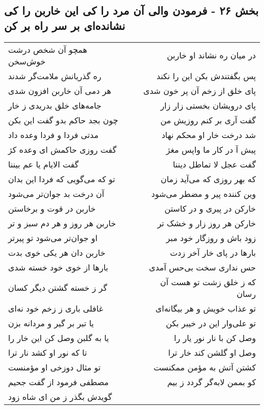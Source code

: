 \begin{center}
\section*{بخش ۲۶ - فرمودن والی آن مرد را کی این خاربن را کی نشانده‌ای بر سر راه بر کن}
\label{sec:sh026}
\begin{longtable}{l p{0.5cm} r}
همچو آن شخص درشت خوش‌سخن
&&
در میان ره نشاند او خاربن
\\
ره گذریانش ملامت‌گر شدند
&&
پس بگفتندش بکن این را نکند
\\
هر دمی آن خاربن افزون شدی
&&
پای خلق از زخم آن پر خون شدی
\\
جامه‌های خلق بدریدی ز خار
&&
پای درویشان بخستی زار زار
\\
چون بجد حاکم بدو گفت این بکن
&&
گفت آری بر کنم روزیش من
\\
مدتی فردا و فردا وعده داد
&&
شد درخت خار او محکم نهاد
\\
گفت روزی حاکمش ای وعده کژ
&&
پیش آ در کار ما واپس مغژ
\\
گفت الایام یا عم بیننا
&&
گفت عجل لا تماطل دیننا
\\
تو که می‌گویی که فردا این بدان
&&
که بهر روزی که می‌آید زمان
\\
آن درخت بد جوان‌تر می‌شود
&&
وین کننده پیر و مضطر می‌شود
\\
خاربن در قوت و برخاستن
&&
خارکن در پیری و در کاستن
\\
خاربن هر روز و هر دم سبز و تر
&&
خارکن هر روز زار و خشک تر
\\
او جوان‌تر می‌شود تو پیرتر
&&
زود باش و روزگار خود مبر
\\
خاربن دان هر یکی خوی بدت
&&
بارها در پای خار آخر زدت
\\
بارها از خوی خود خسته شدی
&&
حس نداری سخت بی‌حس آمدی
\\
گر ز خسته گشتن دیگر کسان
&&
که ز خلق زشت تو هست آن رسان
\\
غافلی باری ز زخم خود نه‌ای
&&
تو عذاب خویش و هر بیگانه‌ای
\\
یا تبر بر گیر و مردانه بزن
&&
تو علی‌وار این در خیبر بکن
\\
یا به گلبن وصل کن این خار را
&&
وصل کن با نار نور یار را
\\
تا که نور او کشد نار ترا
&&
وصل او گلشن کند خار ترا
\\
تو مثال دوزخی او مؤمنست
&&
کشتن آتش به مؤمن ممکنست
\\
مصطفی فرمود از گفت جحیم
&&
کو بممن لابه‌گر گردد ز بیم
\\
گویدش بگذر ز من ای شاه زود

\end{longtable}
\end{center}

